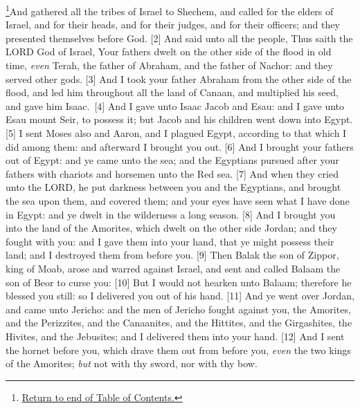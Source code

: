 \footnote{\textcolor[rgb]{0.00,0.25,0.00}{\hyperlink{TOC}{Return to end of Table of Contents.}}}\textcolor[cmyk]{0.99998,1,0,0}{And  gathered all the tribes of Israel to Shechem, and called for the elders of Israel, and for their heads, and for their judges, and for their officers; and they presented themselves before God.}
[2] \textcolor[cmyk]{0.99998,1,0,0}{And  said unto all the people, Thus saith the LORD God of Israel, Your fathers dwelt on the other side of the flood in old time, \emph{even} Terah, the father of Abraham, and the father of Nachor: and they served other gods.}
[3] \textcolor[cmyk]{0.99998,1,0,0}{And I took your father Abraham from the other side of the flood, and led him throughout all the land of Canaan, and multiplied his seed, and gave him Isaac.}\
[4] \textcolor[cmyk]{0.99998,1,0,0}{And I gave unto Isaac Jacob and Esau: and I gave unto Esau mount Seir, to possess it; but Jacob and his children went down into Egypt.}
[5] \textcolor[cmyk]{0.99998,1,0,0}{I sent Moses also and Aaron, and I plagued Egypt, according to that which I did among them: and afterward I brought you out.}
[6] \textcolor[cmyk]{0.99998,1,0,0}{And I brought your fathers out of Egypt: and ye came unto the sea; and the Egyptians pursued after your fathers with chariots and horsemen unto the Red sea.}
[7] \textcolor[cmyk]{0.99998,1,0,0}{And when they cried unto the LORD, he put darkness between you and the Egyptians, and brought the sea upon them, and covered them; and your eyes have seen what I have done in Egypt: and ye dwelt in the wilderness a long season.}
[8] \textcolor[cmyk]{0.99998,1,0,0}{And I brought you into the land of the Amorites, which dwelt on the other side Jordan; and they fought with you: and I gave them into your hand, that ye might possess their land; and I destroyed them from before you.}
[9] \textcolor[cmyk]{0.99998,1,0,0}{Then Balak the son of Zippor, king of Moab, arose and warred against Israel, and sent and called Balaam the son of Beor to curse you:}
[10] \textcolor[cmyk]{0.99998,1,0,0}{But I would not hearken unto Balaam; therefore he blessed you still: so I delivered you out of his hand.}
[11] \textcolor[cmyk]{0.99998,1,0,0}{And ye went over Jordan, and came unto Jericho: and the men of Jericho fought against you, the Amorites, and the Perizzites, and the Canaanites, and the Hittites, and the Girgashites, the Hivites, and the Jebusites; and I delivered them into your hand.}
[12] \textcolor[cmyk]{0.99998,1,0,0}{And I sent the hornet before you, which drave them out from before you, \emph{even} the two kings of the Amorites; \emph{but} not with thy sword, nor with thy bow.}
